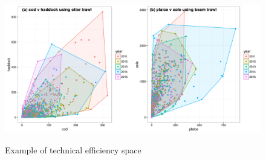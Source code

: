 \documentclass{article}
\begin{document}
\begin{figure}
\begin{center}
	\includegraphics[width=\linewidth]{"Figure 5 - TechnicalEfficiency"}
	\label{fig:5}
	\caption{Example of technical efficiency space}
\end{center}
\end{figure}
\end{document}
